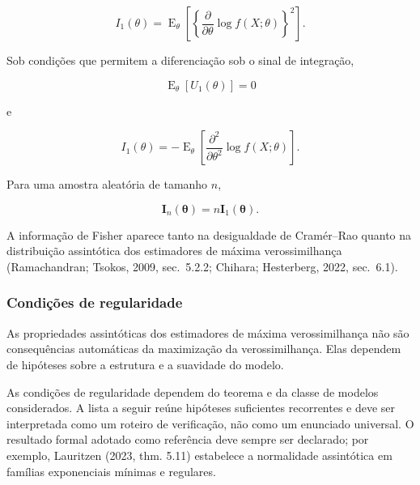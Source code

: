 \documentclass[
  letterpaper,
  DIV=11,
  numbers=noendperiod]{scrreprt}
\begin{document}
\[I_1(\theta)
=
\operatorname{E}_\theta
\left[
\left\{
\frac{\partial}{\partial\theta}
\log f(X;\theta)
\right\}^2
\right].\]

Sob condições que permitem a diferenciação sob o sinal de integração,

\[\operatorname{E}_\theta
[U_1(\theta)]
=
0\]

e

\[I_1(\theta)
=
-
\operatorname{E}_\theta
\left[
\frac{\partial^2}{\partial\theta^2}
\log f(X;\theta)
\right].\]

Para uma amostra aleatória de tamanho \(n\),

\[\mathbf{I}_n(\boldsymbol\theta)
=
n\mathbf{I}_1(\boldsymbol\theta).\]

A informação de Fisher aparece tanto na desigualdade de Cramér--Rao
quanto na distribuição assintótica dos estimadores de máxima
verossimilhança (Ramachandran; Tsokos, 2009, sec.~5.2.2; Chihara;
Hesterberg, 2022, sec.~6.1).

\subsubsection{Condições de
regularidade}\label{condiuxe7uxf5es-de-regularidade}

As propriedades assintóticas dos estimadores de máxima verossimilhança
não são consequências automáticas da maximização da verossimilhança.
Elas dependem de hipóteses sobre a estrutura e a suavidade do modelo.

\begin{tcolorbox}[enhanced jigsaw, colback=white, leftrule=.75mm, colbacktitle=quarto-callout-warning-color!10!white, breakable, titlerule=0mm, bottomtitle=1mm, title=\textcolor{quarto-callout-warning-color}{\faExclamationTriangle}\hspace{0.5em}{Observação --- não existe uma lista universal de condições}, colframe=quarto-callout-warning-color-frame, toprule=.15mm, opacityback=0, bottomrule=.15mm, opacitybacktitle=0.6, arc=.35mm, toptitle=1mm, rightrule=.15mm, coltitle=black, left=2mm]

As condições de regularidade dependem do teorema e da classe de modelos
considerados. A lista a seguir reúne hipóteses suficientes recorrentes e
deve ser interpretada como um roteiro de verificação, não como um
enunciado universal. O resultado formal adotado como referência deve
sempre ser declarado; por exemplo, Lauritzen (2023, thm. 5.11)
estabelece a normalidade assintótica em famílias exponenciais mínimas e
regulares.

\end{tcolorbox}
\end{document}
